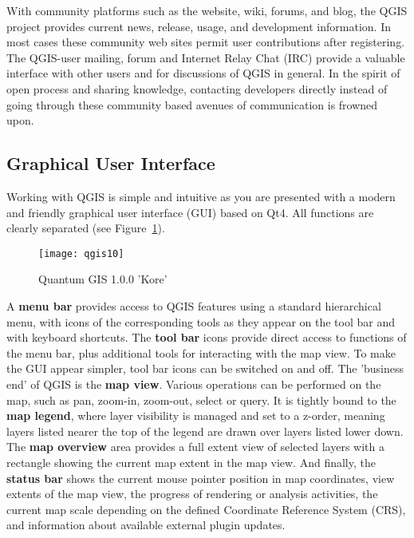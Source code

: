 With community platforms such as the website, wiki, forums, and blog, the QGIS
project provides current news, release, usage, and development information. In
most cases these community web sites permit user contributions after
registering.  The QGIS-user mailing, forum and Internet Relay Chat (IRC)
provide a valuable interface with other users and for discussions of QGIS in
general. In the spirit of open process and sharing knowledge, contacting
developers directly instead of going through these community based avenues of
communication is frowned upon.

\subsection{Graphical User Interface}

Working with QGIS is simple and intuitive as you are presented with a
modern and friendly graphical user interface (GUI) based on Qt4. All
functions are clearly separated (see Figure~\ref{fig:qgis10}).

\begin{figure}[h]
   \begin{center}
   \caption{Quantum GIS 1.0.0 'Kore'}\label{fig:qgis10}\smallskip
   \texttt{[image: qgis10]}
\end{center}
\end{figure}

A \textbf{menu bar} provides access to QGIS features using a standard
hierarchical menu, with icons of the corresponding tools as they appear on
the tool bar and with keyboard shortcuts. The \textbf{tool bar} icons provide
direct access to functions of the menu bar, plus additional tools for
interacting with the map view. To make the GUI appear simpler, tool bar icons
can be switched on and off. The 'business end' of QGIS is the \textbf{map
view}. Various operations can be performed on the map, such as pan, zoom-in,
zoom-out, select or query. It is tightly bound to the \textbf{map legend},
where layer visibility is managed and set to a z-order, meaning layers
listed nearer the top of the legend are drawn over layers listed lower down.
The \textbf{map overview} area provides a full extent view of selected layers
with a rectangle showing the current map extent in the map view. And finally, the
\textbf{status bar} shows the current mouse pointer position in map
coordinates, view extents of the map view, the progress of rendering or
analysis activities, the current map scale depending on the defined
Coordinate Reference System (CRS), and information about available external
plugin updates.

